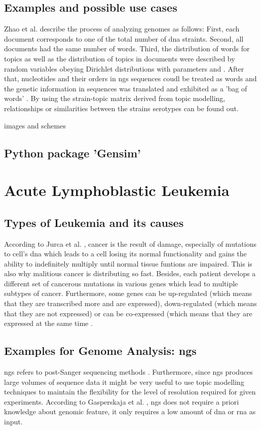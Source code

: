 \section{Examples and possible use cases}\label{lda_examples}

Zhao et al. describe the process of analyzing genomes as follows: First, each document corresponds to one of the total number of \gls{dna} straints. Second, all documents had the same number of words. Third, the distribution of words for topics as well as the distribution of topics in documents were described by random variables obeying Dirichlet distributions with parameters \alpha and \beta. After that, nucleotides and their orders in \gls{ngs} sequences coudl be treated as words and the genetic information in sequences was translated and exhibited as a 'bag of words'  \autocite{zhao_2016}. By using the strain-topic matrix derived from topic modelling, relationships or similarities between the strains serotypes can be found out. 
 
images and schemes
\section{Python package 'Gensim'}\label{gensim}
              
\chapter{Acute Lymphoblastic Leukemia}\label{all}
\section{Types of Leukemia and its causes}\label{leukemia_types}
According to Jurca et al. \autocite{jurca_2016}, cancer is the result of damage, especially of mutations to cell's \gls{dna} which leads to a cell losing its normal functionality and gains the ability to indefinitely multiply until normal tissue funtions are impaired. This is also why malitious cancer is distributing so fast. Besides, each patient develops a different set of cancerous mutations in various genes which lead to multiple subtypes of cancer.
Furthermore, some genes can be up-regulated (which means that they are transcribed more and are expressed), down-regulated (which means that they are not expressed) or can be co-expressed (which means that they are expressed at the same time \autocite{jurca_2016}. 


\section{Examples for Genome Analysis: \gls{ngs}}\label{genome_analysis}
\gls{ngs} refers to post-Sanger sequencing methods \autocite{zhao_2016}. Furthermore, since \gls{ngs} produces large volumes of sequence data it might be very useful to use topic modelling techniques to maintain the flexibility for the level of resolution required for given experiments.  
According to Gasperskaja et al. \autocite{gasperskaja_2017}, \gls{ngs} does not require a priori knowledge about genomic feature, it only requires a low amount of \gls{dna} or \gls{rna} as input.

